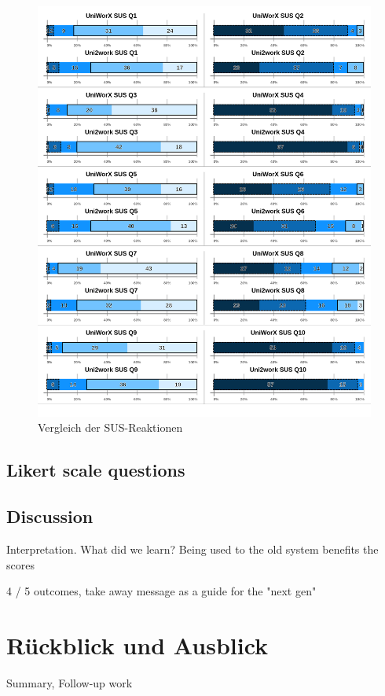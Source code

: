 \documentclass[11pt,a4paper,twoside,ngerman]{article}
\begin{document}
\begin{figure}
    \centering
    \includegraphics[width=\textwidth]{likert_comparison.png}
    \caption{Vergleich der SUS-Reaktionen}
    \label{fig:results_sus}
\end{figure}


\subsection{Likert scale questions} \label{sec:results_likert}

\subsection{Discussion} \label{sec:results_discussion}
Interpretation. What did we learn?
Being used to the old system benefits the scores

4 / 5 outcomes, take away message as a guide for the "next gen"

\clearpage
\section{Rückblick und Ausblick}
Summary, Follow-up work
\end{document}
